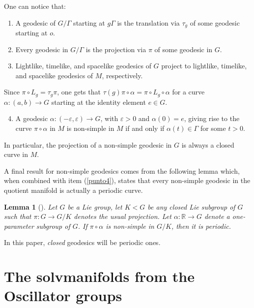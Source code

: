 \documentclass[12pt]{amsart}
\theoremstyle{plain}
\newtheorem{lem}[thm]{Lemma}
\theoremstyle{definition}
\theoremstyle{remark}
\begin{document}
One can notice that:

\begin{enumerate}
    \item A geodesic of \( G/\Gamma \) starting at \( g\Gamma \) is the translation via \( \tau_g \) of some geodesic starting at \( o \). \label{punto1}
    \item Every geodesic in \( G/\Gamma \) is the projection via \( \pi \) of some geodesic in \( G \). \label{punto2}
    \item Lightlike, timelike, and spacelike geodesics of \( G \) project to lightlike, timelike, and spacelike geodesics of \( M \), respectively.
\end{enumerate}

Since \( \pi \circ L_g = \tau_g \pi \), one gets that \( \tau(g)\pi \circ \alpha = \pi \circ L_g \circ \alpha \) for a curve \( \alpha: (a,b) \to G \) starting at the identity element \( e \in G \).

\begin{enumerate}
    \setcounter{enumi}{3}
    \item A geodesic \( \alpha: (-\varepsilon, \varepsilon) \to G \), with \( \varepsilon > 0 \) and \( \alpha(0) = e \), giving rise to the curve \( \pi \circ \alpha \) in \( M \) is non-simple in \( M \) if and only if \( \alpha(t) \in \Gamma \) for some \( t > 0 \). \label{punto4}
\end{enumerate}

In particular, the projection of a non-simple geodesic in \( G \) is always a closed curve in \( M \).

A final result for non-simple geodesics comes from the following lemma which, when combined with item (\ref{punto4}), states that every non-simple geodesic in the quotient manifold is actually a periodic curve.

\begin{lem}[\cite{BOV}]
    Let \( G \) be a Lie group, let \( K < G \) be any closed Lie subgroup of \( G \) such that \( \pi: G \to G/K \) denotes the usual projection. Let \( \alpha: \mathbb{R} \to G \) denote a one-parameter subgroup of \( G \). If \( \pi \circ \alpha \) is non-simple in \( G/K \), then it is periodic.
\end{lem}

In this paper, \textit{closed} geodesics will be periodic ones.

	

	
\section{The solvmanifolds from the Oscillator groups}\label{sectionosc}
\end{document}
